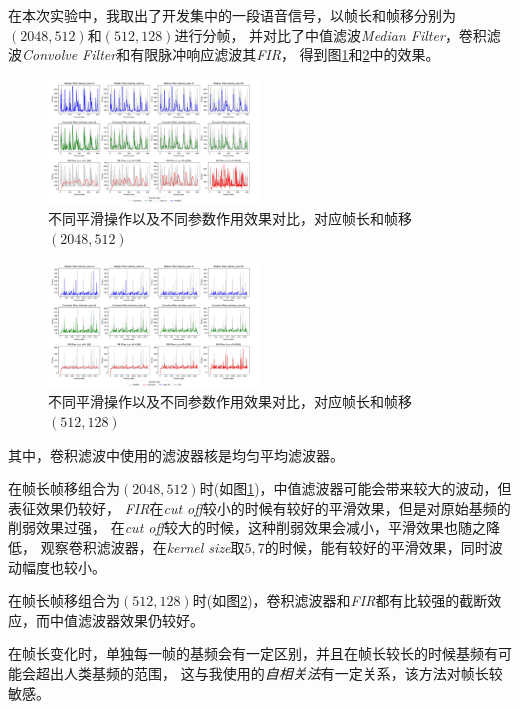 \documentclass[a4paper]{article}
\begin{document}
\begin{enumerate}
{    在本次实验中，我取出了开发集中的一段语音信号，以帧长和帧移分别为$(2048, 512)$和$(512, 128)$进行分帧，
    并对比了中值滤波\emph{Median Filter}，卷积滤波\emph{Convolve Filter}和有限脉冲响应滤波其\emph{FIR}，
    得到图\ref{fig:smooth1}和\ref{fig:smooth2}中的效果。
    \begin{figure}[h]
      \centering
      \includegraphics[width=0.5\textwidth]{figs/counting_on_smooth.pdf}
      \caption{不同平滑操作以及不同参数作用效果对比，对应帧长和帧移$(2048, 512)$}
      \label{fig:smooth1}
    \end{figure}

    \begin{figure}[H]
      \centering
      \includegraphics[width=0.5\textwidth]{figs/counting_on_smooth_2.pdf}
      \caption{不同平滑操作以及不同参数作用效果对比，对应帧长和帧移$(512, 128)$}
      \label{fig:smooth2}
    \end{figure}

    其中，卷积滤波中使用的滤波器核是均匀平均滤波器。

    在帧长帧移组合为$(2048, 512)$时(如图\ref{fig:smooth1})，中值滤波器可能会带来较大的波动，但表征效果仍较好，
    \emph{FIR}在\emph{cut off}较小的时候有较好的平滑效果，但是对原始基频的削弱效果过强，
    在\emph{cut off}较大的时候，这种削弱效果会减小，平滑效果也随之降低，
    观察卷积滤波器，在\emph{kernel size}取$5, 7$的时候，能有较好的平滑效果，同时波动幅度也较小。

    在帧长帧移组合为$(512, 128)$时(如图\ref{fig:smooth2})，卷积滤波器和\emph{FIR}都有比较强的截断效应，而中值滤波器效果仍较好。

    在帧长变化时，单独每一帧的基频会有一定区别，并且在帧长较长的时候基频有可能会超出人类基频的范围，
    这与我使用的\emph{自相关法}有一定关系，该方法对帧长较敏感。

}
\end{enumerate}
\end{document}
